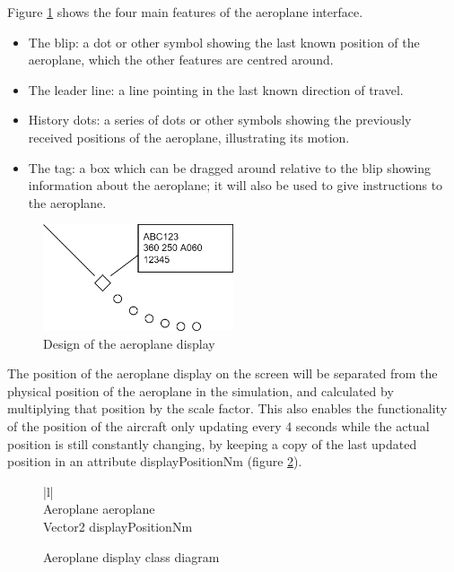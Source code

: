 \documentclass{article}
\begin{document}
Figure \ref{fig:aeroplane_design} shows the four main features of the aeroplane interface.
\begin{itemize}
    \item The blip: a dot or other symbol showing the last known position of the aeroplane, which the other features are centred around.
    \item The leader line: a line pointing in the last known direction of travel.
    \item History dots: a series of dots or other symbols showing the previously received positions of the aeroplane, illustrating its motion.
    \item The tag: a box which can be dragged around relative to the blip showing information about the aeroplane; it will also be used to give instructions to the aeroplane.
\end{itemize}

\begin{figure}[H]
\centering
\includegraphics[width=0.5\textwidth]{diagrams/aeroplane_design.png}
\caption{\label{fig:aeroplane_design}Design of the aeroplane display}
\end{figure}

The position of the aeroplane display on the screen will be separated from the physical position of the aeroplane in the simulation, and calculated by multiplying that position by the scale factor. This also enables the functionality of the position of the aircraft only updating every 4 seconds while the actual position is still constantly changing, by keeping a copy of the last updated position in an attribute displayPositionNm (figure \ref{fig:aeroplanedisplayclass}).

\begin{figure}[H]
\centering
\begin{tabular}{ |l| } 
\hline
{} \\
\hline
Aeroplane aeroplane \\
Vector2 displayPositionNm \\
\hline
\end{tabular}
\caption{\label{fig:aeroplanedisplayclass}Aeroplane display class diagram}
\end{figure}
\end{document}
